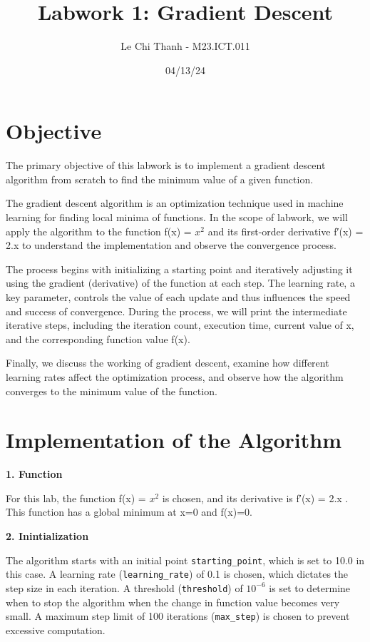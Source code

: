 \documentclass[12pt]{article}
\title{Labwork 1: Gradient Descent}
\author{Le Chi Thanh - M23.ICT.011}
\date{04/13/24}
\begin{document}
\maketitle

\section{Objective}

The primary objective of this labwork is to implement a gradient descent algorithm from scratch to find the minimum value of a given function.

The gradient descent algorithm is an optimization technique used in machine learning for finding local minima of functions.  In the scope of labwork, we will apply the algorithm to the function f(x) = \( x^2 \) and its first-order derivative f′(x) = 2.x to understand the implementation and observe the convergence process. 

The process begins with initializing a starting point and iteratively adjusting it using the gradient (derivative) of the function at each step. The learning rate, a key parameter, controls the value of each update and thus influences the speed and success of convergence. During the process, we will print the intermediate iterative steps, including the iteration count, execution time, current value of x, and the corresponding function value f(x). 

Finally, we discuss the working of gradient descent, examine how different learning rates affect the optimization process, and observe how the algorithm converges to the minimum value of the function.

\section{Implementation of the Algorithm}

\textbf{1. Function}

For this lab, the function f(x) = \( x^2 \) is chosen, and its derivative is f′(x) = 2.x . This function has a global minimum at x=0 and f(x)=0.

\textbf{2. Inintialization}

The algorithm starts with an initial point \texttt{starting\_point}, which is set to 10.0 in this case. A learning rate (\texttt{learning\_rate}) of 0.1 is chosen, which dictates the step size in each iteration. A threshold (\texttt{threshold}) of \(10^{-6}\) is set to determine when to stop the algorithm when the change in function value becomes very small. A maximum step limit of 100 iterations (\texttt{max\_step}) is chosen to prevent excessive computation.
\end{document}
